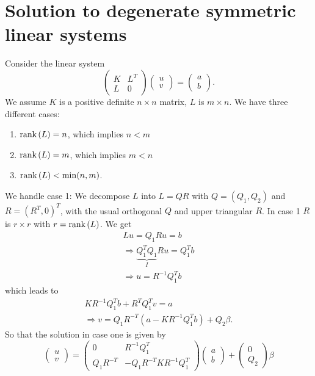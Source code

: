 
\chapter{Solution to degenerate symmetric linear systems}\label{app:degenetate:lin:sys}

Consider the linear system
%
\begin{equation}\label{app:eq:sys}
	\left(\begin{array}{cc}
	K & L^T \\ L & 0
	\end{array}\right)\left(\begin{array}{c}
	u \\ v \end{array}\right) = \left(\begin{array}{c}
	a \\ b
	\end{array}\right).
\end{equation}
%
We assume $K$ is a positive definite $n\times n$ matrix, $L$ is
$m\times n$. We have three different cases:
%
\begin{enumerate}
\item $\text{rank}\left(L\right) = n$, which implies $n<m$
\item $\text{rank}\left(L\right) = m$, which implies $m<n$
\item $\text{rank}\left(L\right) < \min(n,m)$.
\end{enumerate}
%
We handle case 1:
We decompose $L$ into $L = QR$ with $Q = (Q_1, Q_2)$ and $R = (R^T,0)^T$,
with the usual orthogonal $Q$ and upper triangular $R$. In case 1 $R$ is
$r\times r$ with $r=\text{rank}\left(L\right)$. We get
%
\begin{equation}\begin{split}
	L u = Q_1 R u = b\\
	\Rightarrow \underbrace{Q_1^T Q_1}_I R u = Q_1^T b\\
	\Rightarrow u = R^{-1}Q_1^T b
\end{split}\end{equation}
%
which leads to
%
\begin{equation}\begin{split}
	K R^{-1} Q_1^T b + R^T Q_1^T v = a \\
	\Rightarrow v = Q_1 R^{-T}\left(a- K R^{-1} Q_1^T b \right) + Q_2 \beta.
\end{split}\end{equation}
%
So that the solution in case one is given by
%
\begin{equation}
	\left(\begin{array}{c}
	u \\ v \end{array}\right) = \left(\begin{array}{cc}
	0 & R^{-1} Q_1^T \\ Q_1 R^{-T} & - Q_1 R^{-T} K R^{-1} Q_1^T
	\end{array}\right)\left(\begin{array}{c}
	a \\ b
	\end{array}\right) + \left(\begin{array}{c}
	0 \\ Q_2
	\end{array}\right) \beta
\end{equation}

